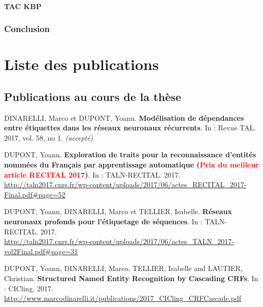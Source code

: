 \documentclass[12pt,a4paper,times,twoside,openright]{report}
\begin{document}
            
            
        \subsubsection{TAC KBP}
        \label{sec:tac-kbp}
        
        
            
            

        \subsection{Conclusion}
        \label{sec:imm-conclusion}
        

\chapter*{Liste des publications}
    
    \section*{Publications au cours de la thèse}
    
    DINARELLI, Marco et DUPONT, Yoann. \textbf{Modélisation de dépendances entre étiquettes dans les réseaux neuronaux récurrents}. In : Revue TAL. 2017, vol. 58, no 1. \textit{(accepté)}
    
    DUPONT, Yoann. \textbf{Exploration de traits pour la reconnaissance d’entités nommées du Français par apprentissage automatique (\textcolor{red}{Prix du meilleur article RECITAL 2017})}. In : TALN-RECITAL. 2017.\\
    \url{http://taln2017.cnrs.fr/wp-content/uploads/2017/06/actes_RECITAL_2017-Final.pdf#page=52}
    
    DUPONT, Yoann, DINARELLI, Marco et TELLIER, Isabelle. \textbf{Réseaux neuronaux profonds pour l’étiquetage de séquences}. In : TALN-RECITAL. 2017.\\
    \url{http://taln2017.cnrs.fr/wp-content/uploads/2017/06/actes_TALN_2017-vol2Final.pdf#page=31}
    
    DUPONT, Yoann, DINARELLI, Marco, TELLIER, Isabelle and LAUTIER, Christian. \textbf{Structured Named Entity Recognition by Cascading CRFs}. In : CICling. 2017.\\
    \url{http://www.marcodinarelli.it/publications/2017_CICling_CRFCascade.pdf}
    
\end{document}
